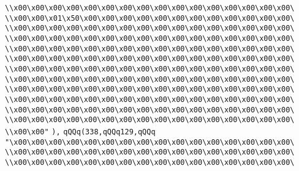 \verb|\\x00\x00\x00\x00\x00\x00\x00\x00\x00\x00\x00\x00\x00\x00\x00\x00\|\newline
\verb|\\x00\x00\x01\x50\x00\x00\x00\x00\x00\x00\x00\x00\x00\x00\x00\x00\|\newline
\verb|\\x00\x00\x00\x00\x00\x00\x00\x00\x00\x00\x00\x00\x00\x00\x00\x00\|\newline
\verb|\\x00\x00\x00\x00\x00\x00\x00\x00\x00\x00\x00\x00\x00\x00\x00\x00\|\newline
\verb|\\x00\x00\x00\x00\x00\x00\x00\x00\x00\x00\x00\x00\x00\x00\x00\x00\|\newline
\verb|\\x00\x00\x00\x00\x00\x00\x00\x00\x00\x00\x00\x00\x00\x00\x00\x00\|\newline
\verb|\\x00\x00\x00\x00\x00\x00\x00\x00\x00\x00\x00\x00\x00\x00\x00\x00\|\newline
\verb|\\x00\x00\x00\x00\x00\x00\x00\x00\x00\x00\x00\x00\x00\x00\x00\x00\|\newline
\verb|\\x00\x00\x00\x00\x00\x00\x00\x00\x00\x00\x00\x00\x00\x00\x00\x00\|\newline
\verb|\\x00\x00\x00\x00\x00\x00\x00\x00\x00\x00\x00\x00\x00\x00\x00\x00\|\newline
\verb|\\x00\x00\x00\x00\x00\x00\x00\x00\x00\x00\x00\x00\x00\x00\x00\x00\|\newline
\verb|\\x00\x00\x00\x00\x00\x00\x00\x00\x00\x00\x00\x00\x00\x00\x00\x00\|\newline
\verb|\\x00\x00"|\newline
\verb|),|\newline
\verb|qQQq(338,qQQq129,qQQq|\newline
\verb|"\x00\x00\x00\x00\x00\x00\x00\x00\x00\x00\x00\x00\x00\x00\x00\x00\|\newline
\verb|\\x00\x00\x00\x00\x00\x00\x00\x00\x00\x00\x00\x00\x00\x00\x00\x00\|\newline
\verb|\\x00\x00\x00\x00\x00\x00\x00\x00\x00\x00\x00\x00\x00\x00\x00\x00\|\newline
